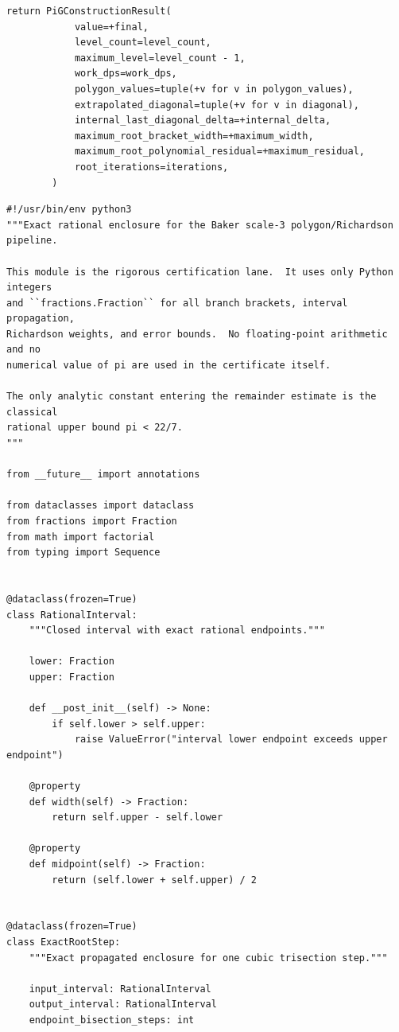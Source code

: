 \documentclass[11pt]{article}
\begin{document}
\begin{lstlisting}[style=pythonstyle,caption={Production lane: \texttt{pi\_g\_construction.py}}]
        return PiGConstructionResult(
            value=+final,
            level_count=level_count,
            maximum_level=level_count - 1,
            work_dps=work_dps,
            polygon_values=tuple(+v for v in polygon_values),
            extrapolated_diagonal=tuple(+v for v in diagonal),
            internal_last_diagonal_delta=+internal_delta,
            maximum_root_bracket_width=+maximum_width,
            maximum_root_polynomial_residual=+maximum_residual,
            root_iterations=iterations,
        )
\end{lstlisting}

\begin{lstlisting}[style=pythonstyle,caption={Exact certification lane: \texttt{certified\_richardson.py}}]
#!/usr/bin/env python3
"""Exact rational enclosure for the Baker scale-3 polygon/Richardson pipeline.

This module is the rigorous certification lane.  It uses only Python integers
and ``fractions.Fraction`` for all branch brackets, interval propagation,
Richardson weights, and error bounds.  No floating-point arithmetic and no
numerical value of pi are used in the certificate itself.

The only analytic constant entering the remainder estimate is the classical
rational upper bound pi < 22/7.
"""

from __future__ import annotations

from dataclasses import dataclass
from fractions import Fraction
from math import factorial
from typing import Sequence


@dataclass(frozen=True)
class RationalInterval:
    """Closed interval with exact rational endpoints."""

    lower: Fraction
    upper: Fraction

    def __post_init__(self) -> None:
        if self.lower > self.upper:
            raise ValueError("interval lower endpoint exceeds upper endpoint")

    @property
    def width(self) -> Fraction:
        return self.upper - self.lower

    @property
    def midpoint(self) -> Fraction:
        return (self.lower + self.upper) / 2


@dataclass(frozen=True)
class ExactRootStep:
    """Exact propagated enclosure for one cubic trisection step."""

    input_interval: RationalInterval
    output_interval: RationalInterval
    endpoint_bisection_steps: int



\end{lstlisting}
\end{document}
